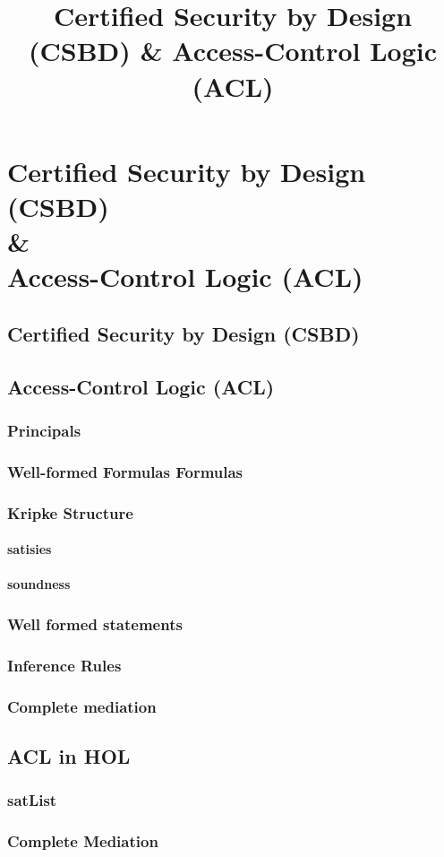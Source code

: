 \documentclass[../../main/main.tex]{subfiles}
\begin{document}
\title{Certified Security by Design (CSBD) \& Access-Control Logic (ACL)}

\chapter[Certified Security by Design (CSBD) \& Access-Control Logic (ACL)]{Certified Security by Design (CSBD)  \\ \& \\ Access-Control Logic (ACL)} \label{chp:csbd_acl}


\section{Certified Security by Design (CSBD)} \label{sec:csbd}

\section{Access-Control Logic (ACL)} \label{sec:acl}

\subsection{Principals}
\subsection{Well-formed Formulas Formulas}
\subsection{Kripke Structure}

\subsubsection{satisies}
\subsubsection{soundness}

\subsection{Well formed statements}
\subsection{Inference Rules}
\subsection{Complete mediation}

\section{ACL in HOL} \label{sec:aclinhol}

\subsection{satList}
\subsection{Complete Mediation}
\end{document}
